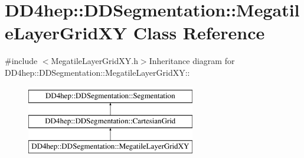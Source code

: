 \hypertarget{class_d_d4hep_1_1_d_d_segmentation_1_1_megatile_layer_grid_x_y}{
\section{DD4hep::DDSegmentation::MegatileLayerGridXY Class Reference}
\label{class_d_d4hep_1_1_d_d_segmentation_1_1_megatile_layer_grid_x_y}
}


{\ttfamily \#include $<$MegatileLayerGridXY.h$>$}Inheritance diagram for DD4hep::DDSegmentation::MegatileLayerGridXY::\begin{figure}[H]
\begin{center}
\leavevmode
\includegraphics[height=3cm]{class_d_d4hep_1_1_d_d_segmentation_1_1_megatile_layer_grid_x_y}
\end{center}
\end{figure}
